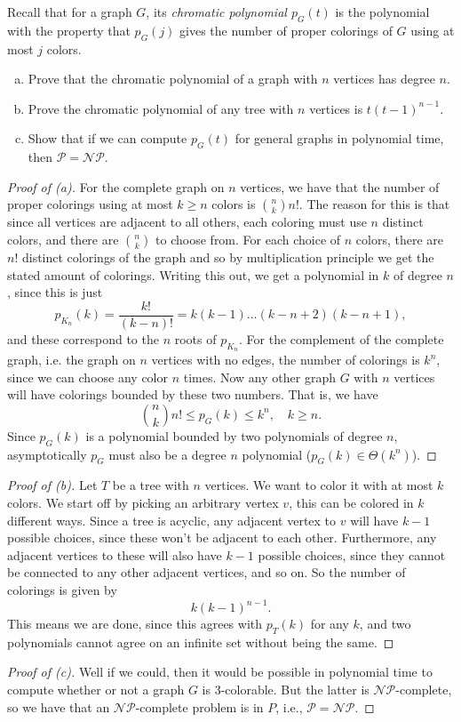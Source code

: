 \documentclass[11pt,a4paper]{article}
\begin{document}
\begin{assignment}
 Recall that for a graph $G$, its \emph{chromatic polynomial $p_G(t)$} is the polynomial with the property that $p_G(j)$
gives the number of proper colorings of $G$ using at most $j$ colors.
\begin{enumerate}[(a)]
\item Prove that the chromatic polynomial of a graph with $n$ vertices has degree $n$.
\item Prove the chromatic polynomial of any tree with $n$ vertices is $t(t-1)^{n-1}$.
\item Show that if we can compute $p_G(t)$ for general graphs in polynomial time, then $\mathcal{P} = \mathcal{NP}$.
\end{enumerate}
\begin{proof}[Proof of (a)]
 For the complete graph on $n$ vertices, we have that the number of proper
colorings using at most $k \geq n$ colors is $\binom{n}{k} n!$. The reason for
this is that since all vertices are adjacent to all others, each coloring must
use $n$ distinct colors, and there are $\binom{n}{k}$ to choose from. For each
choice of $n$ colors, there are $n!$ distinct colorings of the graph and so by
multiplication principle we get the stated amount of colorings. 
Writing this out, we get a polynomial in $k$ of degree $n$, since this is just \[
p_{K_{n}}(k)= \frac{k!}{(k-n)!} = k(k-1)\ldots(k-n+2)(k-n+1),
\] and these correspond to the $n$ roots of $p_{K_{n}}$.
 For the complement of the complete graph, i.e. the graph on $n$ vertices with no edges,
the number of colorings is $k^{n}$, since we can choose any color $n$ times.
Now any other graph $G$ with $n$ vertices will have colorings bounded by these
two numbers. That is, we have \[ \binom{n}{k}n! \leq p_{G}(k) \leq k^{n}, \quad
k  \geq n.
 \] Since $p_{G}(k)$ is a polynomial bounded by two polynomials of degree $n$, asymptotically $p_{G}$ must also be a degree $n$ polynomial ($p_{G}(k) \in \Theta(k^{n})$).
\end{proof}

\begin{proof}[Proof of (b)]
 Let $T$ be a tree with $n$ vertices. We want to color it with at most $k$ colors. 
We start off by picking an arbitrary vertex $v$, this can be colored in $k$ different ways. Since a tree is acyclic, any adjacent vertex to $v$ will have $k-1$ possible choices, since these won't be adjacent to each other. Furthermore, any adjacent vertices to these will also have $k-1$ possible choices, since they cannot be connected to any other adjacent vertices, and so on. So the number of colorings is given by \[
k(k-1) ^{n-1}.
\] This means we are done, since this agrees with $p_{T}(k)$ for any $k$, and two 
polynomials cannot agree on an infinite set without being the same.
\end{proof}
\begin{proof}[Proof of (c)]
Well if we could, then it would be possible in polynomial time to compute whether or not a graph $G$ is 3-colorable. But the latter is $\mathcal{NP}$-complete, so we have that an $\mathcal{NP}$-complete problem is in $P$, i.e., $\mathcal{P} = \mathcal{NP}$.
\end{proof}


\end{assignment}
\end{document}
